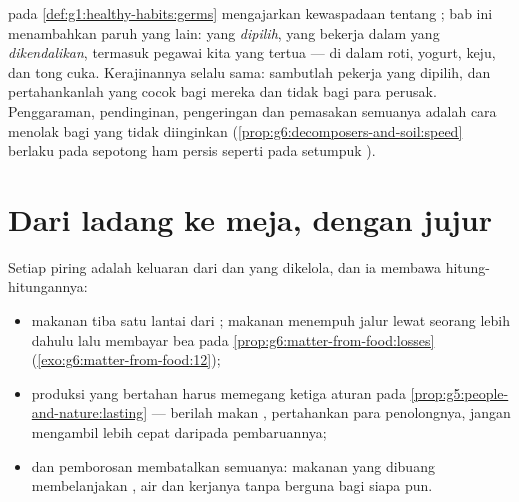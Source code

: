 \begin{remark}\label{rem:g6:producing-our-food:goodbad}
 pada \cref{def:g1:healthy-habits:germs} mengajarkan kewaspadaan
tentang ; bab ini menambahkan paruh yang lain:  yang
\emph{dipilih}, yang bekerja dalam  yang \emph{dikendalikan},
termasuk pegawai kita yang tertua --- di dalam roti, yogurt, keju, dan
tong cuka. Kerajinannya selalu sama: sambutlah pekerja yang dipilih,
dan pertahankanlah  yang cocok bagi mereka dan tidak bagi para
perusak. Penggaraman, pendinginan, pengeringan dan pemasakan semuanya
adalah cara menolak  bagi  yang tidak diinginkan
(\cref{prop:g6:decomposers-and-soil:speed} berlaku pada sepotong ham
persis seperti pada setumpuk ).
\end{remark}

\section{Dari ladang ke meja, dengan jujur}

\begin{proposition}\label{prop:g6:producing-our-food:costs}
Setiap piring adalah keluaran dari  dan  yang
dikelola, dan ia membawa hitung-hitungannya:
\begin{itemize}
  \item makanan  tiba satu lantai dari ; makanan
         menempuh jalur lewat seorang  lebih dahulu lalu
        membayar bea pada
        \cref{prop:g6:matter-from-food:losses}
        (\cref{exo:g6:matter-from-food:12});
  \item produksi yang bertahan harus memegang ketiga aturan pada
        \cref{prop:g5:people-and-nature:lasting} --- berilah makan
        , pertahankan para penolongnya, jangan mengambil lebih
        cepat daripada pembaruannya;
  \item dan pemborosan membatalkan semuanya: makanan yang dibuang
        membelanjakan , air dan kerjanya tanpa berguna bagi
        siapa pun.
\end{itemize}
\end{proposition}
\admitted

